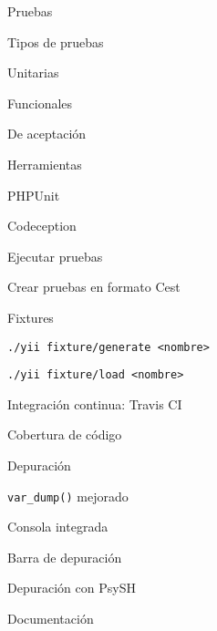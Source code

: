 \begin{longenum}
    \begin{longenum}
        \item Pruebas
        \begin{longenum}
            \item Tipos de pruebas
            \begin{longenum}
                \item Unitarias
                \item Funcionales
                \item De aceptación
            \end{longenum}
            \item Herramientas
            \begin{longenum}
                \item PHPUnit \opcional\
                \item Codeception
                \begin{longenum}
                    \item Ejecutar pruebas
                    \item Crear pruebas en formato Cest
                \end{longenum}
                \item Fixtures
                \begin{longenum}
                    \item \texttt{./yii fixture/generate <nombre>}
                    \item \texttt{./yii fixture/load <nombre>}
                \end{longenum}
            \end{longenum}
            \item Integración continua: Travis CI
            \item Cobertura de código \opcional\
        \end{longenum}
        \item Depuración
        \begin{longenum}
            \item \texttt{var\_dump()} mejorado
            \item Consola integrada
            \item Barra de depuración
            \item Depuración con PsySH \opcional\
        \end{longenum}
        \item Documentación
        \begin{longenum}

\end{longenum}
\end{longenum}
\end{longenum}
